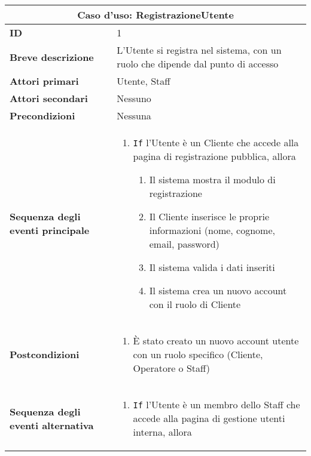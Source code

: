 \documentclass[a4paper]{report}
\begin{document}
\clearpage
\begin{table}[t!]
\vspace*{-8cm}
\renewcommand{\arraystretch}{1.9}
\begin{tabular}{|p{3.9cm}|p{9.9cm}|}
\hline
\multicolumn{2}{|c|}{\textbf{Caso d’uso: RegistrazioneUtente}} \\ \hline
\textbf{ID} & 1 \\ \hline
\textbf{Breve descrizione} & L'Utente si registra nel sistema, con un ruolo che dipende dal punto di accesso \\ \hline
\textbf{Attori primari} & Utente, Staff \\ \hline
\textbf{Attori secondari} & Nessuno \\ \hline
\textbf{Precondizioni} & Nessuna \\ \hline
\textbf{Sequenza degli eventi principale} &
\begin{enumerate}[leftmargin=14pt,label=\arabic*.,labelsep=0.5em,topsep=0pt,partopsep=0pt,parsep=0pt,itemsep=0pt]
    \item \texttt{If} l'Utente è un Cliente che accede alla pagina di registrazione pubblica, allora
    \begin{enumerate}[label=\arabic{enumi}.\arabic*.,leftmargin=22pt,labelsep=0.5em,topsep=0pt,partopsep=0pt,parsep=0pt,itemsep=0pt]
        \item Il sistema mostra il modulo di registrazione
        \item Il Cliente inserisce le proprie informazioni (nome, cognome, email, password)
        \item Il sistema valida i dati inseriti
        \item Il sistema crea un nuovo account con il ruolo di Cliente
    \end{enumerate}
\end{enumerate}\\ \hline
\textbf{Postcondizioni} & 
\begin{enumerate}[leftmargin=14pt,label=\arabic*.,labelsep=0.5em,topsep=0pt,partopsep=0pt,parsep=0pt,itemsep=0pt]
\item È stato creato un nuovo account utente con un ruolo specifico (Cliente, Operatore o Staff) 
\end{enumerate} \\ \hline
\textbf{Sequenza degli eventi alternativa} & \begin{enumerate}[leftmargin=14pt,label=\arabic*.,labelsep=0.5em,topsep=0pt,partopsep=0pt,parsep=0pt,itemsep=0pt]
    \item \texttt{If} l'Utente è un membro dello Staff che accede alla pagina di gestione utenti interna, allora

\end{enumerate}
\end{tabular}
\end{table}
\end{document}

